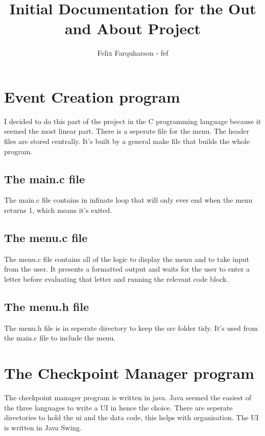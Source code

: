 \documentclass{article}
\begin{document}
\title{Initial Documentation for the Out and About Project}
\author{Felix Farquharson - fef}
\maketitle{}

\tableofcontents{}

\section{Event Creation program}
I decided to do this part of the project in the C programming 
language because it seemed the most linear part. There is a seperate
file for the menu. The header files are stored centrally. It's built 
by a general make file that builds the whole program.

\subsection{The main.c file}
The main.c file contains in infinate loop that will only ever end
when the menu returns 1, which means it's exited.


\subsection{The menu.c file}
The menu.c file contains all of the logic to display the menu and
to take input from the user. It presents a formatted output and
waits for the user to enter a letter before evaluating that letter
and running the relevant code block.


\subsection{The menu.h file}
The menu.h file is in seperate directory to keep the src folder tidy.
It's used from the main.c file to include the menu.


\section{The Checkpoint Manager program}
The checkpoint manager program is written in java. Java seemed the
easiest of the three languages to write a UI in hence the choice.
There are seperate directories to hold the ui and the data code, 
this helps with organisation. The UI is written in Java Swing.
\end{document}
